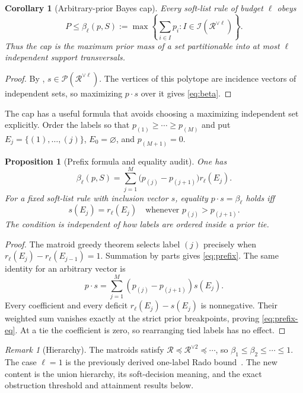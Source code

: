 \documentclass[11pt]{article}
\newtheorem{proposition}[theorem]{Proposition}
\newtheorem{corollary}[theorem]{Corollary}
\theoremstyle{definition}
\theoremstyle{remark}
\newtheorem{remark}[theorem]{Remark}
\newcommand{\cI}{\mathcal I}
\newcommand{\cP}{\mathcal P}
\newcommand{\cR}{\mathcal R}
\begin{document}
\begin{corollary}[Arbitrary-prior Bayes cap]\label{cor:bayes}
Every soft-list rule of budget $\ell$ obeys
\begin{equation}\label{eq:beta}
 P\leq\beta_\ell(p,S)
 :=\max\left\{\sum_{i\in I}p_i:
 I\in\cI(\cR^{\vee\ell})\right\}.
\end{equation}
Thus the cap is the maximum prior mass of a set partitionable into at most
$\ell$ independent support transversals.
\end{corollary}

\begin{proof}
By , $s\in\cP(\cR^{\vee\ell})$.  The vertices of this
polytope are incidence vectors of independent sets, so maximizing $p\cdot s$
over it gives \eqref{eq:beta}.
\end{proof}

The cap has a useful formula that avoids choosing a maximizing independent
set explicitly.  Order the labels so that
$p_{(1)}\geq\cdots\geq p_{(M)}$ and put
$E_j=\{(1),\ldots,(j)\}$, $E_0=\varnothing$, and $p_{(M+1)}=0$.

\begin{proposition}[Prefix formula and equality audit]\label{prop:prefix}
One has
\begin{equation}\label{eq:prefix}
 \beta_\ell(p,S)=
 \sum_{j=1}^{M}\bigl(p_{(j)}-p_{(j+1)}\bigr)r_\ell(E_j).
\end{equation}
For a fixed soft-list rule with inclusion vector $s$, equality
$p\cdot s=\beta_\ell$ holds iff
\begin{equation}\label{eq:prefix-eq}
 s(E_j)=r_\ell(E_j)
 \quad\text{whenever }p_{(j)}>p_{(j+1)}.
\end{equation}
The condition is independent of how labels are ordered inside a prior tie.
\end{proposition}

\begin{proof}
The matroid greedy theorem selects label $(j)$ precisely when
$r_\ell(E_j)-r_\ell(E_{j-1})=1$.  Summation by parts gives
\eqref{eq:prefix}.  The same identity for an arbitrary vector is
\[
 p\cdot s=\sum_{j=1}^{M}
 (p_{(j)}-p_{(j+1)})s(E_j).
\]
Every coefficient and every deficit
$r_\ell(E_j)-s(E_j)$ is nonnegative.  Their weighted sum vanishes exactly at
the strict prior breakpoints, proving \eqref{eq:prefix-eq}.  At a tie the
coefficient is zero, so rearranging tied labels has no effect.
\end{proof}

\begin{remark}[Hierarchy]
The matroids satisfy
$\cR\preceq\cR^{\vee2}\preceq\cdots$, so
$\beta_1\leq\beta_2\leq\cdots\leq1$.  The case $\ell=1$ is the previously
derived one-label Rado bound~\cite{eriksson2026matroid}.  The new content is
the union hierarchy, its soft-decision meaning, and the exact obstruction threshold and
attainment results below.
\end{remark}
\end{document}
